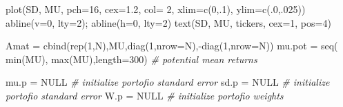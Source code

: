 \documentclass[
  oneside]{book}
\newenvironment{Shaded}{\begin{snugshade}}{\end{snugshade}}
\newcommand{\AttributeTok}[1]{\textcolor[rgb]{0.77,0.63,0.00}{#1}}
\newcommand{\CommentTok}[1]{\textcolor[rgb]{0.56,0.35,0.01}{\textit{#1}}}
\newcommand{\ConstantTok}[1]{\textcolor[rgb]{0.00,0.00,0.00}{#1}}
\newcommand{\DecValTok}[1]{\textcolor[rgb]{0.00,0.00,0.81}{#1}}
\newcommand{\FloatTok}[1]{\textcolor[rgb]{0.00,0.00,0.81}{#1}}
\newcommand{\FunctionTok}[1]{\textcolor[rgb]{0.00,0.00,0.00}{#1}}
\newcommand{\NormalTok}[1]{#1}
\newcommand{\OtherTok}[1]{\textcolor[rgb]{0.56,0.35,0.01}{#1}}
\newcommand{\SpecialCharTok}[1]{\textcolor[rgb]{0.00,0.00,0.00}{#1}}
\begin{document}
\begin{Shaded}
\begin{Highlighting}[]
\FunctionTok{plot}\NormalTok{(SD, MU, }\AttributeTok{pch=}\DecValTok{16}\NormalTok{, }\AttributeTok{cex=}\FloatTok{1.2}\NormalTok{, }\AttributeTok{col=} \DecValTok{2}\NormalTok{,  }\AttributeTok{xlim=}\FunctionTok{c}\NormalTok{(}\DecValTok{0}\NormalTok{,.}\DecValTok{1}\NormalTok{), }\AttributeTok{ylim=}\FunctionTok{c}\NormalTok{(.}\DecValTok{0}\NormalTok{,.}\DecValTok{025}\NormalTok{))}
\FunctionTok{abline}\NormalTok{(}\AttributeTok{v=}\DecValTok{0}\NormalTok{, }\AttributeTok{lty=}\DecValTok{2}\NormalTok{); }\FunctionTok{abline}\NormalTok{(}\AttributeTok{h=}\DecValTok{0}\NormalTok{, }\AttributeTok{lty=}\DecValTok{2}\NormalTok{) }
\FunctionTok{text}\NormalTok{(SD, MU, tickers, }\AttributeTok{cex=}\DecValTok{1}\NormalTok{, }\AttributeTok{pos=}\DecValTok{4}\NormalTok{)}

\NormalTok{Amat }\OtherTok{=} \FunctionTok{cbind}\NormalTok{(}\FunctionTok{rep}\NormalTok{(}\DecValTok{1}\NormalTok{,N),MU,}\FunctionTok{diag}\NormalTok{(}\DecValTok{1}\NormalTok{,}\AttributeTok{nrow=}\NormalTok{N),}\SpecialCharTok{{-}}\FunctionTok{diag}\NormalTok{(}\DecValTok{1}\NormalTok{,}\AttributeTok{nrow=}\NormalTok{N))}
\NormalTok{mu.pot }\OtherTok{=} \FunctionTok{seq}\NormalTok{( }\FunctionTok{min}\NormalTok{(MU), }\FunctionTok{max}\NormalTok{(MU),}\AttributeTok{length=}\DecValTok{300}\NormalTok{) }\CommentTok{\# potential mean returns}

\NormalTok{mu.p }\OtherTok{=} \ConstantTok{NULL} \CommentTok{\# initialize portofio standard error }
\NormalTok{sd.p }\OtherTok{=} \ConstantTok{NULL} \CommentTok{\# initialize portofio standard error }
\NormalTok{W.p }\OtherTok{=} \ConstantTok{NULL} \CommentTok{\# initialize portofio weights }


\end{Highlighting}
\end{Shaded}
\end{document}
